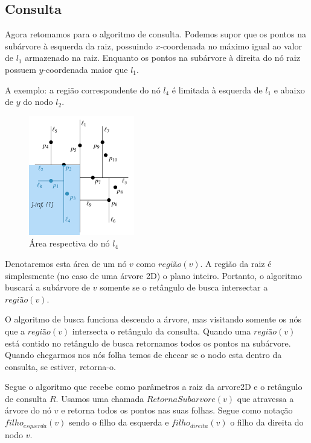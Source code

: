 \subsection{Consulta}

Agora retomamos para o algoritmo de consulta. Podemos supor que os pontos na subárvore à esquerda
da raiz, possuindo $x$-coordenada no máximo igual ao valor de $l_1$ armazenado na raiz.
Enquanto os pontos na subárvore à direita do nó raiz possuem $y$-coordenada maior que $l_1$.

A exemplo: a região correspondente do nó \(l_4\) é limitada à esquerda de
\(l_1\) e abaixo de \(y\) do nodo \(l_2\).


\begin{figure}[htb]
    \caption{\label{fig:Fig_4} Área respectiva do nó $l_4$}
    \begin{center}
        \includegraphics{images/kd_tree2.png}
    \end{center}
\end{figure}

Denotaremos esta área de um nó \(v\) como \(região(v)\). A região da raiz é simplesmente
(no caso de uma árvore 2D) o plano inteiro.
Portanto, o algoritmo buscará a subárvore de \(v\) somente se o retângulo de busca intersectar
a \(região(v)\).

O algoritmo de busca funciona descendo a árvore, mas visitando somente os nós que a
\(região(v)\) intersecta o retângulo da consulta. Quando uma \(região(v)\) está contido no
retângulo de busca retornamos todos os pontos na subárvore.
Quando chegarmos nos nós folha temos de checar se o nodo esta dentro da consulta, se estiver,
retorna-o.

Segue o algoritmo que recebe como parâmetros a raiz da arvore2D e o retângulo de consulta \(R\).
Usamos uma chamada \(RetornaSubarvore(v)\) que atravessa a árvore do nó \(v\) e retorna
todos os pontos nas suas folhas. Segue como notação \(filho_{esquerda}(v)\) sendo o filho da esquerda e
\(filho_{direita}(v)\) o filho da direita do nodo \(v\).


